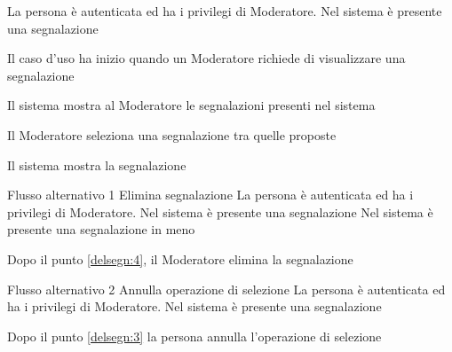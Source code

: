 {}
{La persona è autenticata ed ha i privilegi di Moderatore. Nel sistema è presente una segnalazione}
{\postNulle}
{\begin{enumCU}
	\item Il caso d'uso ha inizio quando un Moderatore richiede di visualizzare una segnalazione
	\item Il sistema mostra al Moderatore le segnalazioni presenti nel sistema\label{delsegn:3}
	\item Il Moderatore seleziona una segnalazione tra quelle proposte
	\item Il sistema mostra la segnalazione \label{delsegn:4}
\end{enumCU}}
%
{Flusso alternativo 1}%
{Elimina segnalazione}%
{La persona è autenticata ed ha i privilegi di Moderatore. Nel sistema è presente una segnalazione}
{Nel sistema è presente una segnalazione in meno}%
{\begin{enumCU}
		\item Dopo il punto \ref{delsegn:4}, il Moderatore elimina la segnalazione
\end{enumCU}}%
%	
{Flusso alternativo 2}%
{Annulla operazione di selezione}%
{La persona è autenticata ed ha i privilegi di Moderatore. Nel sistema è presente una segnalazione}%
{\postNulle}%
{\begin{enumCU}
		\item Dopo il punto \ref{delsegn:3} la persona annulla l'operazione di selezione
\end{enumCU}}%


